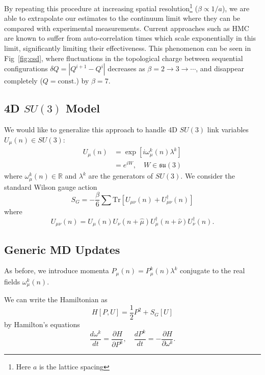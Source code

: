 \documentclass[a4paper,11pt]{article}
\begin{document}
By repeating this procedure at increasing spatial resolution\footnote{Here $a$ is the lattice spacing} ($\beta \propto 1
/ a$), we are able to extrapolate our
estimates to the continuum limit where they can be compared with experimental
measurements.
%
Current approaches such as HMC are known to suffer from auto-correlation times
which scale exponentially in this limit, significantly limiting their
effectiveness.
%
This phenomenon can be seen in Fig~\ref{fig:csd}, where fluctuations in the
topological charge between sequential configurations $\delta Q = |Q^{i + 1} - Q^{i}|$ decreases as $\beta = 2
\rightarrow 3 \rightarrow \cdots$, and disappear completely ($Q =
\mathrm{const.}$) by $\beta = 7$.
%
%

\subsection{\label{subsec:4dSU3}4D \texorpdfstring{$SU(3)$}{SU(3)} Model}
%
We would like to generalize this approach to handle 4D $SU(3)$ link variables $U_{\mu}(n) \in SU(3)$:
%
\begin{align}
U_{\mu}(n) &= \exp\left[i \omega_{\mu}^{k}(n) \lambda^{k} \right] \\
&= e^{iW}, \quad W \in \mathfrak{su}(3)
\end{align}
%
where $\omega_{\mu}^{k}(n) \in \mathbb{R}$ and $\lambda^{k}$ are the generators
of $SU(3)$.
%
We consider the standard Wilson gauge action
%
\begin{equation}
S_{G} = -\frac{\beta}{6}\sum \mathrm{Tr}\left[U_{\mu\nu}(n) + U^{\dagger}_{\mu\nu}(n) \right]
\end{equation}
%
where 
\begin{equation}
    U_{\mu\nu}(n) = U_{\mu}(n) U_{\nu}(n + \hat{\mu}) U_{\mu}^{\dagger}(n + \hat{\nu}) U^{\dagger}_{\nu}(n).
\end{equation}
%
\subsection{\label{subsec:hmc-4dSU3}Generic MD Updates}
%
As before, we introduce momenta $P_{\mu}(n) = P^{k}_{\mu}(n) \lambda^{k}$
conjugate to the real fields $\omega_{\mu}^{k}(n)$.

%
We can write the Hamiltonian as
%
\begin{equation}
    H[P, U] = \frac{1}{2} P^{2} + S_{G}[U]
\end{equation}
%
by Hamilton's equations
%
\begin{equation}
\frac{d\omega^{k}}{dt} = \frac{\partial H}{\partial P^{k}},
\quad \frac{dP^{k}}{dt} = - \frac{\partial H}{\partial \omega^{k}}.
\end{equation}
%
\end{document}

